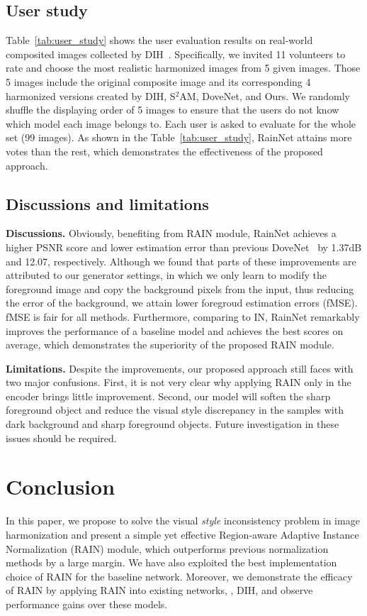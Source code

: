 \documentclass[final]{cvpr}
\begin{document}
\subsection{User study} 
\label{subsec:user_study}
Table~\ref{tab:user_study} shows the user evaluation results on real-world composited images collected by DIH~\cite{tsai2017deep}. Specifically, we invited 11 volunteers to rate and choose the most realistic harmonized images from 5 given images. Those 5 images include the original composite image and its corresponding 4 harmonized versions created by DIH, S$^2$AM, DoveNet, and Ours. We randomly shuffle the displaying order of 5 images to ensure that the users do not know which model each image belongs to. Each user is asked to evaluate for the whole set (99 images). As shown in the Table~\ref{tab:user_study}, RainNet attains more votes than the rest, which demonstrates the effectiveness of the proposed approach. 


\subsection{Discussions and limitations}
\label{subsec:limitation_discussion}
\noindent\textbf{Discussions.} Obviously, benefiting from RAIN module, RainNet achieves a higher PSNR score and lower estimation error than previous DoveNet~\cite{cong2020dovenet} by 1.37dB and 12.07, respectively. Although we found that parts of these improvements are attributed to our generator settings, in which we only learn to modify the foreground image and copy the background pixels from the input, thus reducing the error of the background, we attain lower foregroud estimation errors (fMSE). fMSE is fair for all methods. Furthermore, comparing to IN, RainNet remarkably improves the performance of a baseline model and achieves the best scores on average, which demonstrates the superiority of the proposed RAIN module. 

\noindent\textbf{Limitations.} Despite the improvements, our proposed approach still faces with two major confusions. First, it is not very clear why applying RAIN only in the encoder brings little improvement. Second, our model will soften the sharp foreground object and reduce the visual style discrepancy in the samples with dark background and sharp foreground objects. Future investigation in these issues should be required. 

\section{Conclusion}
\label{sec:conclusion}
In this paper, we propose to solve the visual \emph{style} inconsistency problem in image harmonization and present a simple yet effective Region-aware Adaptive Instance Normalization (RAIN) module, which outperforms previous normalization methods by a large margin. We have also exploited the best implementation choice of RAIN for the baseline network. Moreover, we demonstrate the efficacy of RAIN by applying RAIN into existing networks, \eg, DIH, and observe performance gains over these models. 
\end{document}
